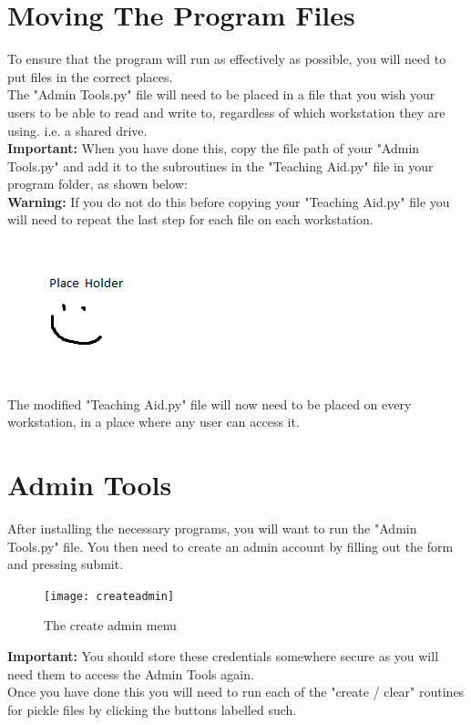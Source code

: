 \documentclass{report}
\begin{document}
\section{Moving The Program Files}
To ensure that the program will run as effectively as possible, you will need to put files in the correct places.\\
The "Admin Tools.py" file will need to be placed in a file that you wish your users to be able to read and write to, regardless of which workstation they are using. i.e. a shared drive.\\ \textbf{Important:} When you have done this, copy the file path of your "Admin Tools.py" and add it to the subroutines in the "Teaching Aid.py" file in your program folder, as shown below:\\
\textbf{Warning: }If you do not do this before copying your "Teaching Aid.py" file you will need to repeat the last step for each file on each workstation.\\
\includegraphics{placeholder}\\

The modified "Teaching Aid.py" file will now need to be placed on every workstation, in a place where any user can access it.
\section{Admin Tools}
After installing the necessary programs, you will want to run the "Admin Tools.py" file. You then need to create an admin account by filling out the form and pressing submit.\\
\bigskip
\begin{figure}[h]
\centering
\texttt{[image: createadmin]}
\caption{The create admin menu}
\label{fig:createadmin}
\end{figure}
\bigskip
\textbf{Important: }You should store these credentials somewhere secure as you will need them to access the Admin Tools again.\\
 Once you have done this you will need to run each of the "create / clear" routines for pickle files by clicking the buttons labelled such.\\
 
\end{document}

